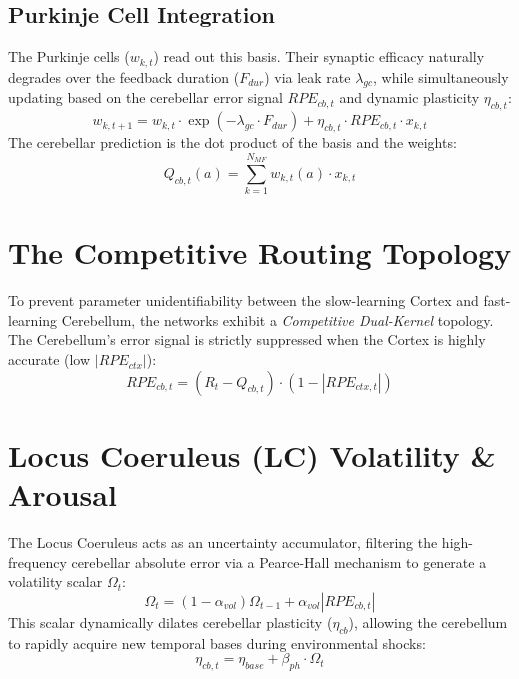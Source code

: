 ﻿\documentclass[12pt]{article}
\begin{document}
\subsection{Purkinje Cell Integration}
The Purkinje cells ($w_{k, t}$) read out this basis. Their synaptic efficacy naturally degrades over the feedback duration ($F_{dur}$) via leak rate $\lambda_{gc}$, while simultaneously updating based on the cerebellar error signal $RPE_{cb, t}$ and dynamic plasticity $\eta_{cb, t}$:
\begin{equation}
    w_{k, t+1} = w_{k, t} \cdot \exp(-\lambda_{gc} \cdot F_{dur}) + \eta_{cb, t} \cdot RPE_{cb, t} \cdot x_{k, t}
\end{equation}
The cerebellar prediction is the dot product of the basis and the weights:
\begin{equation}
    Q_{cb, t}(a) = \sum_{k=1}^{N_{MF}} w_{k, t}(a) \cdot x_{k, t}
\end{equation}

\section{The Competitive Routing Topology}
To prevent parameter unidentifiability between the slow-learning Cortex and fast-learning Cerebellum, the networks exhibit a \textit{Competitive Dual-Kernel} topology. The Cerebellum's error signal is strictly suppressed when the Cortex is highly accurate (low $|RPE_{ctx}|$):
\begin{equation}
    RPE_{cb, t} = (R_t - Q_{cb, t}) \cdot (1 - |RPE_{ctx, t}|)
\end{equation}

\section{Locus Coeruleus (LC) Volatility \& Arousal}
The Locus Coeruleus acts as an uncertainty accumulator, filtering the high-frequency cerebellar absolute error via a Pearce-Hall mechanism to generate a volatility scalar $\Omega_t$:
\begin{equation}
    \Omega_t = (1 - \alpha_{vol}) \Omega_{t-1} + \alpha_{vol} |RPE_{cb, t}|
\end{equation}
This scalar dynamically dilates cerebellar plasticity ($\eta_{cb}$), allowing the cerebellum to rapidly acquire new temporal bases during environmental shocks:
\begin{equation}
    \eta_{cb, t} = \eta_{base} + \beta_{ph} \cdot \Omega_t
\end{equation}
\end{document}
